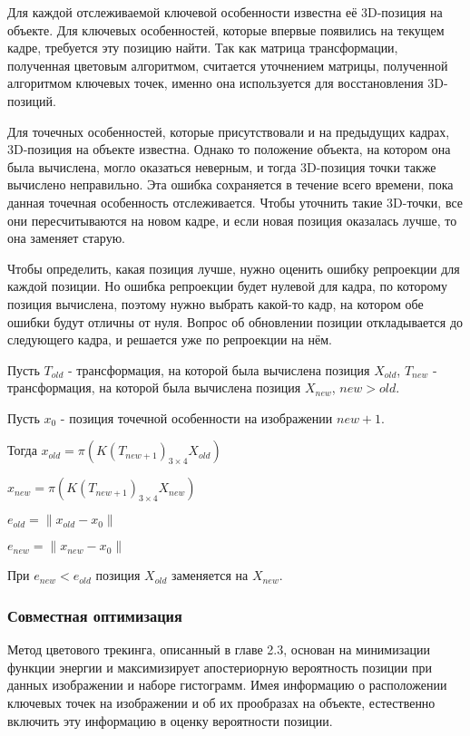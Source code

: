 Для каждой отслеживаемой ключевой особенности известна её 3D-позиция на
объекте.
Для ключевых особенностей, которые впервые появились на текущем кадре,
требуется эту позицию найти.
Так как матрица трансформации, полученная цветовым алгоритмом, считается
уточнением матрицы, полученной алгоритмом ключевых точек, именно она
используется для восстановления 3D-позиций.


Для точечных особенностей, которые присутствовали и на предыдущих кадрах,
3D-позиция на объекте известна.
Однако то положение объекта, на котором она была вычислена, могло оказаться
неверным, и тогда 3D-позиция точки также вычислено неправильно.
Эта ошибка сохраняется в течение всего времени, пока данная точечная
особенность отслеживается.
Чтобы уточнить такие 3D-точки, все они пересчитываются на новом кадре, и если
новая позиция оказалась лучше, то она заменяет старую.

Чтобы определить, какая позиция лучше, нужно оценить ошибку репроекции для
каждой позиции.
Но ошибка репроекции будет нулевой для кадра, по которому позиция вычислена,
поэтому нужно выбрать какой-то кадр, на котором обе ошибки будут отличны от
нуля.
Вопрос об обновлении позиции откладывается до следующего кадра, и решается уже
по репроекции на нём.

Пусть $T_{old}$ - трансформация, на которой была вычислена позиция $X_{old}$,
$T_{new}$ - трансформация, на которой была вычислена позиция
$X_{new}$, $new > old$.

Пусть $x_0$ - позиция точечной особенности на изображении $new + 1$. 

Тогда $x_{old} = \pi (K (T_{new + 1})_{3 \times 4} X_{old})$

$x_{new} = \pi (K (T_{new + 1})_{3 \times 4} X_{new})$

$e_{old} = \| x_{old} - x_0 \|$

$e_{new} = \| x_{new} - x_0 \|$

При $e_{new} < e_{old}$ позиция $X_{old}$ заменяется на $X_{new}$.

\subsubsection{Совместная оптимизация}

Метод цветового трекинга, описанный в главе 2.3, основан на минимизации функции
энергии и максимизирует апостериорную вероятность позиции при данных
изображении и наборе гистограмм.
Имея информацию о расположении ключевых точек на изображении и об их прообразах
на объекте, естественно включить эту информацию в оценку вероятности позиции.

